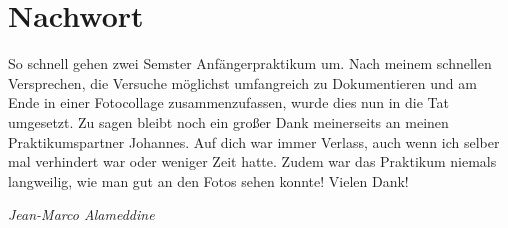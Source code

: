 \section{Nachwort}
So schnell gehen zwei Semster Anfängerpraktikum um.
Nach meinem schnellen Versprechen, die Versuche möglichst umfangreich zu Dokumentieren und am Ende in einer Fotocollage zusammenzufassen, wurde dies nun in die Tat umgesetzt.
Zu sagen bleibt noch ein großer Dank meinerseits an meinen Praktikumspartner Johannes.
Auf dich war immer Verlass, auch wenn ich selber mal verhindert war oder weniger Zeit hatte.
Zudem war das Praktikum niemals langweilig, wie man gut an den Fotos sehen konnte!
Vielen Dank!

\textit{Jean-Marco Alameddine}
